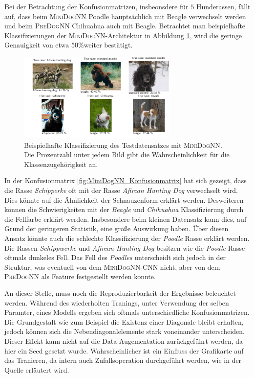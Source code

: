 Bei der Betrachtung der Konfusionmatrizen, insbeonsdere für $5$ Hunderassen,
fällt auf, dass beim \textsc{MiniDogNN} Poodle hauptsächlich mit Beagle verwechselt
werden und beim \textsc{PreDogNN} Chihuahua auch mit Beagle. Betrachtet man
beispielhafte Klassifizierungen der \textsc{MiniDogNN}-Architektur in Abbildung \ref{fig:klasifizierung_MiniDogNN},
wird die geringe Genauigkeit von etwa $50\%$weiter bestätigt.
\begin{figure}
\centering
\includegraphics[width = 0.7\textwidth]{../../final_data/MiniNN_n5/visualize_predictions.pdf}
\caption{Beispielhafte Klassifizierung des Testdatensatzes mit \textsc{MiniDogNN}.
        Die Prozentzahl unter jedem Bild gibt die Wahrscheinlichkeit für die Klassenzugehörigkeit an.}
\label{fig:klasifizierung_MiniDogNN}
\end{figure}
In der Konfusionmatrix \ref{fig:MiniDogNN_Konfusionmatrix} hat sich gezeigt, dass
die Rasse \emph{Schipperke} oft mit der Rasse \emph{Afircan Hunting Dog} verwechselt
wird. Dies könnte auf die Ähnlichkeit der Schnauzenform erklärt werden. Desweiteren
können die Schwierigkeiten mit der \emph{Beagle} und \emph{Chihuahua} Klassifizierung
durch die Fellfarbe erklärt werden. Insbesondere beim kleinen Datensatz kann dies,
auf Grund der geringeren Statistik, eine große Auswirkung haben. Über diesen Ansatz
könnte auch die schlechte Klassifizierung der \emph{Poodle} Rasse erklärt werden.
Die Rassen \emph{Schippwerke} und \emph{Afircan Hunting Dog} besitzen wie die
\emph{Poodle} Rasse oftmals dunkeles Fell. Das Fell des \emph{Poodles} unterscheidt sich jedoch
in der Struktur, was eventuell von dem \textsc{MiniDogNN}-CNN nicht, aber von dem
\textsc{PreDogNN} als Feature festgestellt werden konnte.

An dieser Stelle, muss noch die Reproduzierbarkeit der Ergebnisse beleuchtet werden.
Während des wiederholten Tranings, unter Verwendung der selben Paramter, eines Modells
ergeben sich oftmals unterschiedliche Konfusionmatrizen. Die Grundgestalt wie zum Beispiel
die Existenz einer Diagonale bleibt erhalten, jedoch können sich die Nebendiagonalelemente
stark voneinander unterscheiden. Dieser Effekt kann nicht auf die Data Augementation
zurückgeführt werden, da hier ein Seed gesetzt wurde. Wahrscheinlicher ist ein Einfluss
der Grafikarte auf das Tranieren, da intern auch Zufallsoperation durchgeführt werden,
wie in der Quelle \cite{Reproduzierbarkeit} erläutert wird.

